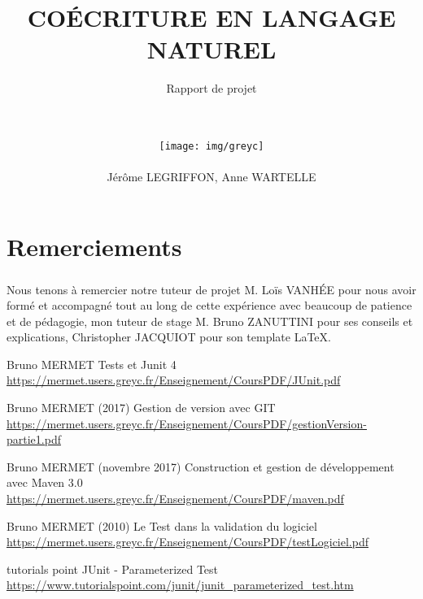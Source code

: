 \documentclass[
    12pt,
	headsepline=on,
	footsepline=on,
	twoside=off,
	abstract=on,
	DIV=10
]{scrreprt}
\title{
	\hrulefill
	\vfill
	\Huge \bfseries COÉCRITURE EN LANGAGE NATUREL
}
\subtitle{
	Rapport de projet\\
	\hfill
	\\
	\hrulefill
	\hfill\\
}
\author{
	\small
	\texttt{[image: img/greyc]}\\
	\hfill\\
	Jérôme LEGRIFFON, Anne WARTELLE
}
\date{}
\begin{document}
	\maketitle
	
	
	\tableofcontents
	
	\chapter*{Remerciements}
		\paragraph{} 
			Nous tenons à remercier notre tuteur de projet M. Loïs VANHÉE pour nous avoir formé et accompagné tout au long de cette expérience avec beaucoup de patience et de pédagogie, mon tuteur de stage M. Bruno ZANUTTINI pour ses conseils et explications, Christopher JACQUIOT pour son template \LaTeX.
			\clearpage
	

    
    
    
    
    
    
    
	\cleardoublepage
	\pagebreak
	
	
	\begin{thebibliography}{}
	    Bruno MERMET
	    Tests et Junit 4
        \url{https://mermet.users.greyc.fr/Enseignement/CoursPDF/JUnit.pdf}
        
	    Bruno MERMET (2017)
	    Gestion de version avec GIT
        \url{https://mermet.users.greyc.fr/Enseignement/CoursPDF/gestionVersion-partie1.pdf}
        
	    Bruno MERMET (novembre 2017)
	    Construction et gestion de développement avec Maven 3.0
        \url{https://mermet.users.greyc.fr/Enseignement/CoursPDF/maven.pdf}
        
	    Bruno MERMET (2010)
	    Le Test dans la validation du logiciel
        \url{https://mermet.users.greyc.fr/Enseignement/CoursPDF/testLogiciel.pdf}
        
        tutorials point
        JUnit - Parameterized Test
        \url{https://www.tutorialspoint.com/junit/junit_parameterized_test.htm}
        
	\end{thebibliography}
\end{document}
